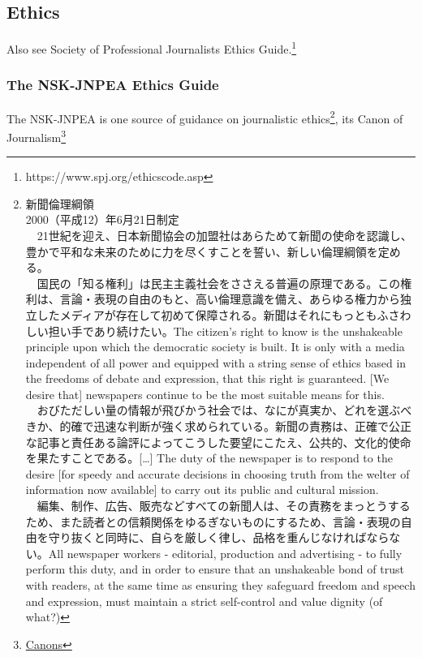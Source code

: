 \documentclass[11pt, headings=normal]{scrartcl}
\begin{document}
\hypertarget{ethics}{%
\subsection{Ethics}\label{ethics}}

Also see Society of Professional Journalists Ethics Guide.\footnote{https://www.spj.org/ethicscode.asp}

\hypertarget{the-nsk-ethics-guide}{%
\subsubsection{The NSK-JNPEA Ethics Guide}\label{the-nsk-ethics-guide}}

The NSK-JNPEA is one source of guidance on journalistic ethics\footnote{新聞倫理綱領\\
  2000（平成12）年6月21日制定\\
  　21世紀を迎え、日本新聞協会の加盟社はあらためて新聞の使命を認識し、豊かで平和な未来のために力を尽くすことを誓い、新しい倫理綱領を定める。\\
  　国民の「知る権利」は民主主義社会をささえる普遍の原理である。この権利は、言論・表現の自由のもと、高い倫理意識を備え、あらゆる権力から独立したメディアが存在して初めて保障される。新聞はそれにもっともふさわしい担い手であり続けたい。The
  citizen's right to know is the unshakeable principle upon which the
  democratic society is built. It is only with a media independent of
  all power and equipped with a string sense of ethics based in the
  freedoms of debate and expression, that this right is guaranteed.
  {[}We desire that{]} newspapers continue to be the most suitable means
  for this.\\
  　おびただしい量の情報が飛びかう社会では、なにが真実か、どれを選ぶべきか、的確で迅速な判断が強く求められている。新聞の責務は、正確で公正な記事と責任ある論評によってこうした要望にこたえ、公共的、文化的使命を果たすことである。{[}\ldots{}{]}
  The duty of the newspaper is to respond to the desire {[}for speedy
  and accurate decisions in choosing truth from the welter of
  information now available{]} to carry out its public and cultural
  mission.\\
  　編集、制作、広告、販売などすべての新聞人は、その責務をまっとうするため、また読者との信頼関係をゆるぎないものにするため、言論・表現の自由を守り抜くと同時に、自らを厳しく律し、品格を重んじなければならない。All
  newspaper workers - editorial, production and advertising - to fully
  perform this duty, and in order to ensure that an unshakeable bond of
  trust with readers, at the same time as ensuring they safeguard
  freedom and speech and expression, must maintain a strict self-control
  and value dignity (of what?)}, its Canon of Journalism\footnote{\href{http://www.pressnet.or.jp/outline/ethics/index.html}{Canons}}
\end{document}
